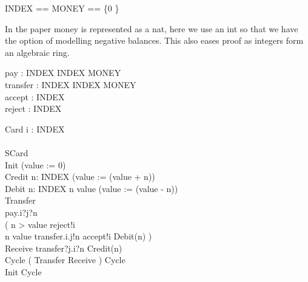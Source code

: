 
\begin{circus}
INDEX == \nat %
\also MONEY == \{0 \} %
\end{circus}
In the paper money is represented as a nat, here we use an int so that we
have the option of modelling negative balances. This also eases proof as
integers form an algebraic ring.

\begin{circus}
\circchannel pay : INDEX \cross INDEX \cross MONEY\\ %
\circchannel transfer : INDEX \cross INDEX \cross MONEY\\ %
\circchannel accept : INDEX\\ %
\circchannel reject : INDEX %
\end{circus}
\begin{circus}

\circprocess Card \circdef  i : INDEX \circspot\\
\circbegin\\
\circstate SCard \\
Init \circdef (value := 0)\\
Credit \circdef \circvar n: INDEX \circspot(value := (value + n))\\
Debit \circdef \circvar n: INDEX \circspot \lcircguard n \leq value \rcircguard \circguard (value := (value - n))\\
Transfer \circdef\\
  pay.i?j?n \then\\
    ( \lcircguard n > value \rcircguard \circguard reject!i \then \Skip\\
    \extchoice \lcircguard n \leq value \rcircguard \circguard transfer.i.j!n \then accept!i \then Debit(n) )\\
Receive \circdef transfer?j.i?n \then Credit(n)\\
Cycle \circdef ( Transfer \extchoice Receive ) \circseq Cycle\\
\circspot Init \circseq Cycle\\
\circend
\end{circus}

